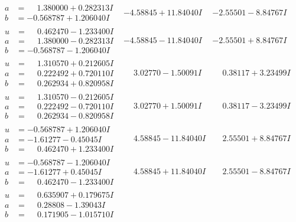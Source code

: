 \documentclass[1p]{elsarticle_modified}
\theoremstyle{definition}
\begin{document}
$$\begin{array}{c|c|c}
\begin{aligned}
a &= \phantom{-}1.380000 + 0.282313 I \\
b &= -0.568787 + 1.206040 I\end{aligned}
 & -4.58845 + 11.84040 I & -2.55501 - 8.84767 I \\ \hline\begin{aligned}
u &= \phantom{-}0.462470 - 1.233400 I \\
a &= \phantom{-}1.380000 - 0.282313 I \\
b &= -0.568787 - 1.206040 I\end{aligned}
 & -4.58845 - 11.84040 I & -2.55501 + 8.84767 I \\ \hline\begin{aligned}
u &= \phantom{-}1.310570 + 0.212605 I \\
a &= \phantom{-}0.222492 + 0.720110 I \\
b &= \phantom{-}0.262934 + 0.820958 I\end{aligned}
 & \phantom{-}3.02770 - 1.50091 I & \phantom{-}0.38117 + 3.23499 I \\ \hline\begin{aligned}
u &= \phantom{-}1.310570 - 0.212605 I \\
a &= \phantom{-}0.222492 - 0.720110 I \\
b &= \phantom{-}0.262934 - 0.820958 I\end{aligned}
 & \phantom{-}3.02770 + 1.50091 I & \phantom{-}0.38117 - 3.23499 I \\ \hline\begin{aligned}
u &= -0.568787 + 1.206040 I \\
a &= -1.61277 - 0.45045 I \\
b &= \phantom{-}0.462470 + 1.233400 I\end{aligned}
 & \phantom{-}4.58845 - 11.84040 I & \phantom{-}2.55501 + 8.84767 I \\ \hline\begin{aligned}
u &= -0.568787 - 1.206040 I \\
a &= -1.61277 + 0.45045 I \\
b &= \phantom{-}0.462470 - 1.233400 I\end{aligned}
 & \phantom{-}4.58845 + 11.84040 I & \phantom{-}2.55501 - 8.84767 I \\ \hline\begin{aligned}
u &= \phantom{-}0.635907 + 0.179675 I \\
a &= \phantom{-}0.28808 - 1.39043 I \\
b &= \phantom{-}0.171905 - 1.015710 I\end{aligned}

\end{array}$$
\end{document}
